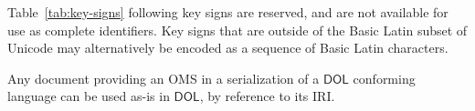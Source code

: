 \documentclass[10pt, a4paper]{isov2}
\newcommand*{\DOL}{\ensuremath{\mathsf{DOL}}\xspace}
\begin{document}


Table~\ref{tab:key-signs} following key signs are reserved, and are not available for use as complete identifiers.  Key signs that are outside of the Basic Latin subset of Unicode may alternatively be encoded as a sequence of Basic Latin characters.




\label{sec:existing-serialization}
Any document providing an OMS in a serialization of a \DOL conforming
language can be used as-is in \DOL, by reference to its IRI.
\end{document}
